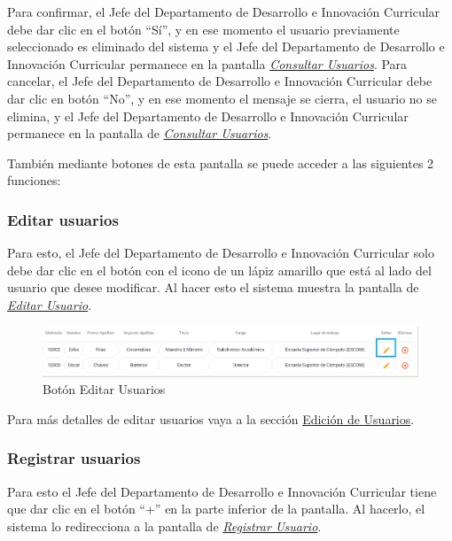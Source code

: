 \begin{enumerate}
\begin{figure}[H]
	\end{figure}
	
	Para confirmar, el Jefe del Departamento de Desarrollo e Innovación Curricular debe dar clic en el botón “Sí”, y en ese momento el usuario previamente seleccionado es eliminado del sistema y el Jefe del Departamento de Desarrollo e Innovación Curricular permanece en la pantalla \hyperlink{consultarUs}{\textit{Consultar Usuarios}}.
	Para cancelar, el Jefe del Departamento de Desarrollo e Innovación Curricular debe dar clic en botón “No”, y en ese momento el mensaje se cierra, el usuario no se elimina, y el Jefe del Departamento de Desarrollo e Innovación Curricular permanece en la pantalla de \hyperlink{consultarUs}{\textit{Consultar Usuarios}}.
	
\end{enumerate}

También mediante botones de esta pantalla se puede acceder a las siguientes 2 funciones:

\subsubsection{Editar usuarios}

Para esto, el Jefe del Departamento de Desarrollo e Innovación Curricular solo debe dar clic en el botón con el icono de un lápiz amarillo que está al lado del usuario que desee modificar. Al hacer esto el sistema muestra la pantalla  de \hyperlink{editarUs}{\textit{Editar Usuario}}.

\begin{figure}[H]
	\centering
	\hypertarget{editar}{\includegraphics[width=0.7\linewidth]{images/SP5/BtnEditar}}
	\caption{Botón Editar Usuarios}
	\label{editar}
\end{figure}

Para más detalles de editar usuarios vaya a la sección \hyperlink{editar-user}{Edición de Usuarios}.

\subsubsection{Registrar  usuarios}

Para esto el Jefe del Departamento de Desarrollo e Innovación Curricular tiene que dar clic en el botón “+” en la parte inferior de la pantalla. Al hacerlo, el sistema  lo redirecciona a la pantalla de \hyperlink{registrarUs}{\textit{Registrar Usuario}}.

